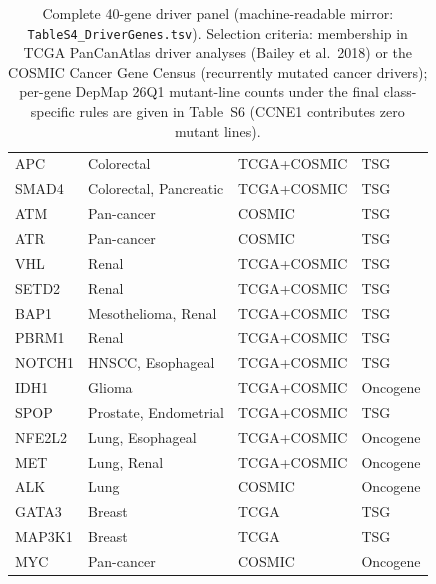 \documentclass[11pt,a4paper]{article}
\begin{document}
\begin{table}[H]
\begin{tabular}{llll}
APC & Colorectal & TCGA+COSMIC & TSG \\
SMAD4 & Colorectal, Pancreatic & TCGA+COSMIC & TSG \\
ATM & Pan-cancer & COSMIC & TSG \\
ATR & Pan-cancer & COSMIC & TSG \\
VHL & Renal & TCGA+COSMIC & TSG \\
SETD2 & Renal & TCGA+COSMIC & TSG \\
BAP1 & Mesothelioma, Renal & TCGA+COSMIC & TSG \\
PBRM1 & Renal & TCGA+COSMIC & TSG \\
NOTCH1 & HNSCC, Esophageal & TCGA+COSMIC & TSG \\
IDH1 & Glioma & TCGA+COSMIC & Oncogene \\
SPOP & Prostate, Endometrial & TCGA+COSMIC & TSG \\
NFE2L2 & Lung, Esophageal & TCGA+COSMIC & Oncogene \\
MET & Lung, Renal & TCGA+COSMIC & Oncogene \\
ALK & Lung & COSMIC & Oncogene \\
GATA3 & Breast & TCGA & TSG \\
MAP3K1 & Breast & TCGA & TSG \\
MYC & Pan-cancer & COSMIC & Oncogene \\
\bottomrule
\end{tabular}
\caption{Complete 40-gene driver panel (machine-readable mirror: \texttt{TableS4\_DriverGenes.tsv}).
Selection criteria: membership in TCGA PanCanAtlas driver analyses (Bailey et al.\ 2018) or the COSMIC Cancer Gene Census (recurrently mutated cancer drivers); per-gene DepMap 26Q1 mutant-line counts under the final class-specific rules are given in Table~S6 (CCNE1 contributes zero mutant lines).}
\end{table}
\end{document}
